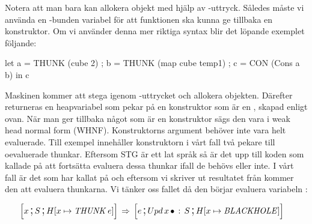 \documentclass[../Core]{subfiles}
\begin{document}
Notera att man bara kan allokera objekt med hjälp av -uttryck. Således
måste vi använda en -bunden variabel  för att funktionen ska kunna ge tillbaka en konstruktor.
Om vi använder denna mer riktiga syntax blir det löpande exemplet följande:

\begin{codeEx}
let { a = THUNK (cube 2)
    ; b = THUNK (map cube temp1)
    ; c = CON (Cons a b)
    } in c
\end{codeEx}

Maskinen kommer att stega igenom -uttrycket och allokera objekten.
Därefter returneras en heapvariabel som pekar på en konstruktor
som är en , skapad enligt ovan. När man ger tillbaka något som är
en konstruktor sägs den vara i weak head normal form (WHNF). Konstruktorns
argument behöver inte vara helt evaluerade. Till exempel innehåller konstruktorn i vårt fall
två pekare till oevaluerade thunkar. Eftersom STG är ett
lat språk så är det upp till koden som kallade på  att fortsätta
evaluera dessa thunkar ifall de behövs eller inte. I vårt fall är
det  som har kallat på  och eftersom vi skriver ut resultatet från 
kommer den att evaluera thunkarna. Vi tänker oss fallet då den börjar evaluera variabeln :

\begin{align*}
\text{\large$$}\Big[x \,\text{\Large;}\, S \,\text{\Large;}\, & H[x\mapsto\text{\emph{THUNK}}\,e]\Big] \,\Rightarrow\, \text{\large$$}\Big[e \,\text{\Large;}\, Upd\, x\,\bullet \,:\, S \,\text{\Large;}\, H[x\mapsto \text{\emph{BLACKHOLE}}]\Big]
\end{align*}
\end{document}
